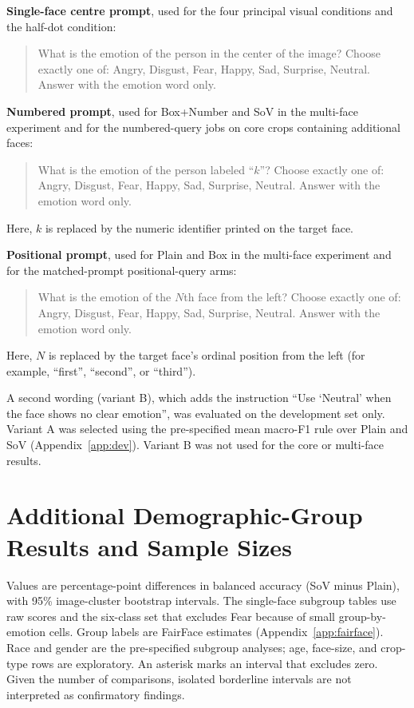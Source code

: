\documentclass[lettersize,journal]{IEEEtran}
\begin{document}
\textbf{Single-face centre prompt}, used for the four principal visual conditions and the half-dot condition:
\begin{quote}\small
What is the emotion of the person in the center of the image? Choose exactly one of: Angry, Disgust, Fear, Happy, Sad, Surprise, Neutral. Answer with the emotion word only.
\end{quote}

\textbf{Numbered prompt}, used for Box+Number and SoV in the multi-face experiment and for the numbered-query jobs on core crops containing additional faces:
\begin{quote}\small
What is the emotion of the person labeled ``$k$''? Choose exactly one of: Angry, Disgust, Fear, Happy, Sad, Surprise, Neutral. Answer with the emotion word only.
\end{quote}
Here, $k$ is replaced by the numeric identifier printed on the target face.

\textbf{Positional prompt}, used for Plain and Box in the multi-face experiment and for the matched-prompt positional-query arms:
\begin{quote}\small
What is the emotion of the $N$th face from the left? Choose exactly one of: Angry, Disgust, Fear, Happy, Sad, Surprise, Neutral. Answer with the emotion word only.
\end{quote}
Here, $N$ is replaced by the target face's ordinal position from the left (for example, ``first'', ``second'', or ``third'').

A second wording (variant B), which adds the instruction ``Use `Neutral' when the face shows no clear emotion'', was evaluated on the development set only. Variant A was selected using the pre-specified mean macro-F1 rule over Plain and SoV (Appendix~\ref{app:dev}). Variant B was not used for the core or multi-face results.

\section{Additional Demographic-Group Results and Sample Sizes}
\label{app:groups}
Values are percentage-point differences in balanced accuracy (SoV minus Plain), with 95\% image-cluster bootstrap intervals. The single-face subgroup tables use raw scores and the six-class set that excludes Fear because of small group-by-emotion cells. Group labels are FairFace estimates (Appendix~\ref{app:fairface}). Race and gender are the pre-specified subgroup analyses; age, face-size, and crop-type rows are exploratory. An asterisk marks an interval that excludes zero. Given the number of comparisons, isolated borderline intervals are not interpreted as confirmatory findings.
\end{document}
